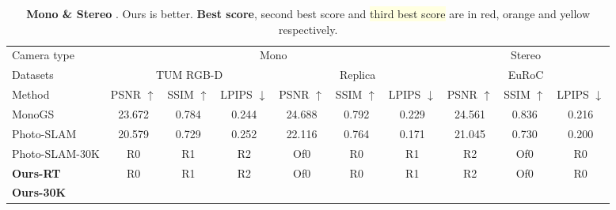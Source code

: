 \begin{table*}
\footnotesize
  \centering
   \setlength\tabcolsep{10pt} 
  \begin{tabular}{@{}l|ccc|ccc|ccc} %
    \toprule   
   Camera type & \multicolumn{6}{c|}{Mono} & \multicolumn{3}{c}{Stereo}\\
   Datasets & \multicolumn{3}{c}{TUM RGB-D} & \multicolumn{3}{c|}{Replica} & \multicolumn{3}{c}{EuRoC} \\
    \midrule
   Method &  PSNR $\uparrow$ &SSIM $\uparrow$   &LPIPS $\downarrow$ &  PSNR $\uparrow$ &SSIM $\uparrow$   &LPIPS $\downarrow$ &  PSNR $\uparrow$ &SSIM $\uparrow$   &LPIPS $\downarrow$  \\
    \midrule          
       {MonoGS}& 23.672 & 0.784 & 0.244 & 24.688 &	0.792 &	0.229 & 24.561 & 0.836 & 0.216 \\
       {Photo-SLAM} & 20.579	&0.729	&0.252 & 22.116 &	0.764	& 0.171 & 21.045	&0.730	&0.200 \\
       {Photo-SLAM-30K} & R0 & R1 & R2 & Of0 & R0 & R1 & R2 & Of0 & R0\\
       {\bf Ours-RT}  & R0 & R1 & R2 & Of0 & R0 & R1 & R2 & Of0 & R0\\
       {\bf Ours-30K}  & \cellcolor{lightred}{\bf 24.533} & \cellcolor{lightred}{\bf 0.821} & \cellcolor{lightred}{\bf 0.163} & \cellcolor{lightred}{\bf 26.928} & \cellcolor{lightred}{\bf 0.863} & \cellcolor{lightred}{\bf 0.086} & \cellcolor{lightred}{\bf 26.379} & \cellcolor{lightred}{\bf 0.875} & \cellcolor{lightred}{\bf 0.112} \\
    \bottomrule
  \end{tabular}
  \caption{{\bf Mono \& Stereo} . Ours is better. \colorbox{lightred}{\bf Best score}, \colorbox{lightorange}{second best score} and \colorbox{lightyellow}{third best score} are in red, orange and yellow respectively.}
  \label{tab:example}
\end{table*}



